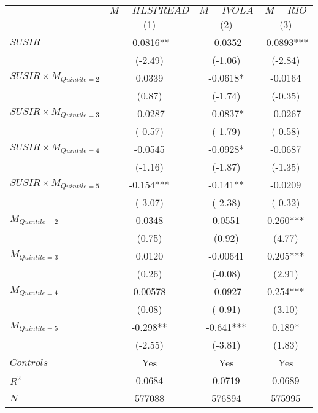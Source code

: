 \begin{tabular}{lccc}
\hline
        & $M = HLSPREAD$ & $M = IVOLA$ & $M = RIO$ \bigstrut[t]\\
        & (1)     & (2)     & (3) \bigstrut[b]\\
\hline
\rowcolor[rgb]{ .933,  .925,  .882} $SUSIR$ & -0.0816** & -0.0352 & -0.0893*** \bigstrut[t]\\
\rowcolor[rgb]{ .933,  .925,  .882}         & (-2.49) & (-1.06) & (-2.84) \\
\rowcolor[rgb]{ .933,  .925,  .882} $SUSIR \times M_{Quintile=2}$ & 0.0339  & -0.0618* & -0.0164 \\
\rowcolor[rgb]{ .933,  .925,  .882}         & (0.87)  & (-1.74) & (-0.35) \\
\rowcolor[rgb]{ .933,  .925,  .882} $SUSIR \times  M_{Quintile=3}$ & -0.0287 & -0.0837* & -0.0267 \\
\rowcolor[rgb]{ .933,  .925,  .882}         & (-0.57) & (-1.79) & (-0.58) \\
\rowcolor[rgb]{ .933,  .925,  .882} $SUSIR \times  M_{Quintile=4}$ & -0.0545 & -0.0928* & -0.0687 \\
\rowcolor[rgb]{ .933,  .925,  .882}         & (-1.16) & (-1.87) & (-1.35) \\
\rowcolor[rgb]{ .933,  .925,  .882} $SUSIR \times  M_{Quintile=5}$ & -0.154*** & -0.141** & -0.0209 \\
\rowcolor[rgb]{ .933,  .925,  .882}         & (-3.07) & (-2.38) & (-0.32) \\
$M_{Quintile=2}$ & 0.0348  & 0.0551  & 0.260*** \\
        & (0.75)  & (0.92)  & (4.77) \\
$M_{Quintile=3}$ & 0.0120  & -0.00641 & 0.205*** \\
        & (0.26)  & (-0.08) & (2.91) \\
$M_{Quintile=4}$ & 0.00578 & -0.0927 & 0.254*** \\
        & (0.08)  & (-0.91) & (3.10) \\
$M_{Quintile=5}$ & -0.298** & -0.641*** & 0.189* \\
        & (-2.55) & (-3.81) & (1.83) \bigstrut[b]\\
\hline
$Controls$ & Yes     & Yes     & Yes \bigstrut[t]\\
$R^2$   & 0.0684  & 0.0719  & 0.0689 \\
$N$     & 577088  & 576894  & 575995 \bigstrut[b]\\
\hline
\end{tabular}%
